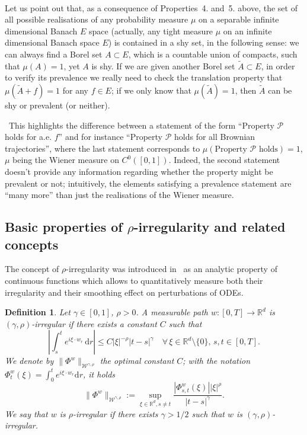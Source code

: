 \documentclass[10pt]{article}
\newcommand{\assign}{:=}
\newcommand{\mathd}{\mathrm{d}}
\newcommand{\tmstrong}[1]{\textbf{#1}}
\newtheorem{definition}[theorem]{Definition}
\begin{document}
\

Let us point out that, as a consequence of Properties~4. and~5. above, the
set of all possible realisations of any probability measure $\mu$ on a
separable infinite dimensional Banach $E$ space (actually, any tight measure $\mu$ on an infinite dimensional Banach
space $E$) is contained in a shy set, in the following sense: we can always
find a Borel set $A \subset E$, which is a countable union of compacts, such
that $\mu (A) = 1$, yet $A$ is shy. If we are given another Borel set
$\tilde{A} \subset E$, in order to verify its prevalence we really need to
check the translation property that $\mu (\tilde{A} + f) = 1$ for any $f \in
E$; if we only know that $\mu (\tilde{A}) = 1$, then $\tilde{A}$ can be shy or
prevalent (or neither).

\ This highlights the difference between a statement of the form ``Property
$\mathcal{P}$ holds for a.e. $f$'' and for instance ``Property $\mathcal{P}$
holds for all Brownian trajectories'', where the last statement corresponds to
$\mu \left( \text{Property $\mathcal{P}$ holds} \right) = 1$, $\mu$ being the
Wiener measure on $C^0 ([0, 1])$. Indeed, the second statement doesn't provide
any information regarding whether the property might be prevalent or not;
intuitively, the elements satisfying a prevalence statement are ``many more''
than just the realisations of the Wiener measure.

\subsection{Basic properties of $\rho$\mbox{-}irregularity and related
concepts}\label{sec2.2}

The concept of $\rho$\mbox{-}irregularity was introduced
in~{\cite{catelliergubinelli}} as an analytic property of continuous functions
which allows to quantitatively measure both their irregularity and their
smoothing effect on perturbations of ODEs.

\begin{definition}\label{sec2.2 defn rho irregularity}
Let $\gamma\in [0,1]$, $\rho > 0$. A measurable
  path $w : [0, T] \rightarrow \mathbb{R}^d$ is $(\gamma,
  \rho)$\mbox{-}irregular{\tmstrong{}} if there exists a constant $C$ such
  that
  \begin{equation}
    \left| \int_s^t e^{i \xi \cdot w_r} \, \mathd r \right| \leqslant C | \xi
    |^{- \rho} | t - s |^{\gamma} \quad \forall \, \xi \in \mathbb{R}^d
    \setminus \{ 0 \}, \, s, t \in [0, T] . \label{sec2.2 defn rho-irr}
  \end{equation}
  We denote by $\| \Phi^w \|_{\mathcal{W}^{\gamma, \rho}}$ the optimal
  constant $C$; with the notation $\Phi^w_t (\xi) = \int_0^t e^{i \xi \cdot
  w_r} \mathd r$, it holds
  \[ \| \Phi^w \|_{\mathcal{W}^{\gamma, \rho}} \assign \sup_{\xi \in
     \mathbb{R}^d, s \neq t} \frac{| \Phi^w_{s, t} (\xi) | | \xi |^{\rho}}{| t
     - s |^{\gamma}} . \]
  We say that $w$ is $\rho$\mbox{-}irregular if there exists $\gamma > 1 / 2$
  such that $w$ is $(\gamma, \rho)$-irregular.
\end{definition}
\end{document}
